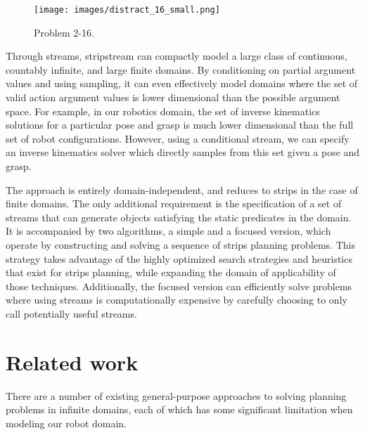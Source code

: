 \documentclass[letterpaper]{article} %
\theoremstyle{plain}\newtheorem{thm}{Theorem}
\theoremstyle{definition}\newtheorem{defn}{Definition}
\theoremstyle{plain}\newtheorem{lem}{Lemma}
\theoremstyle{plain}\newtheorem{cor}{Corollary}
\newcommand{\algname}{{\sc strips}tream}
\newcommand{\strips}{{\sc strips}}
\begin{document}
\begin{figure}[ht]
\centering
\texttt{[image: images/distract\_16\_small.png]}
\caption{Problem 2-16.} 
\label{fig:tamp_domains}
\end{figure}

Through streams, \algname{} can compactly model
a large class of continuous, countably infinite, and large finite domains.
By conditioning on partial argument values
and using sampling, it can even effectively
model domains where the set of valid action argument values is lower
dimensional than the possible argument space. For example, in our robotics domain, the set of 
inverse kinematics solutions for a particular pose and grasp is much lower dimensional than the full set of robot configurations. However, using a conditional
stream, we can specify an inverse kinematics solver which directly samples from this
set given a pose and grasp.


The approach is entirely domain-independent, and reduces to \strips{} in
the case of finite domains.  The only additional requirement is the
specification of a set of streams that can generate objects satisfying
the static predicates in the domain. 
It is accompanied by two algorithms, a simple
and a focused version, which operate by constructing and solving a
sequence of \strips{} planning problems.  
This strategy takes advantage
of the highly optimized search strategies and heuristics that exist
for \strips{} planning, while expanding the domain of
applicability of those techniques.
Additionally, the focused version can efficiently solve problems where using streams is computationally expensive by carefully choosing to only call potentially useful streams. %

\section{Related work}
There are a number of existing general-purpose approaches to solving planning problems in infinite domains, each of which has some significant limitation when modeling our robot domain.
\end{document}
